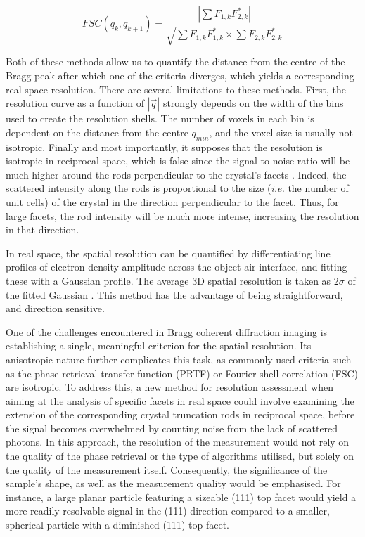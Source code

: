 \begin{equation}
    FSC(q_k, q_{k+1}) = \frac{ |\sum F_{1,k} F_{2,k}^*| }{\sqrt{ \sum F_{1,k} F_{1,k}^* \times \sum F_{2,k} F_{2,k}^*}}
\end{equation}

Both of these methods allow us to quantify the distance from the centre of the Bragg peak after which one of the criteria diverges, which yields a corresponding real space resolution.
There are several limitations to these methods.
First, the resolution curve as a function of $|\vec{q}|$ strongly depends on the width of the bins used to create the resolution shells.
The number of voxels in each bin is dependent on the distance from the centre $q_{min}$, and the voxel size is usually not isotropic.
Finally and most importantly, it supposes that the resolution is isotropic in reciprocal space, which is false since the signal to noise ratio will be much higher around the rods perpendicular to the crystal's facets \parencite{Cherukara2018a}.
Indeed, the scattered intensity along the rods is proportional to the size (\textit{i.e.} the number of unit cells) of the crystal in the direction perpendicular to the facet.
Thus, for large facets, the rod intensity will be much more intense, increasing the resolution in that direction.

In real space, the spatial resolution can be quantified by differentiating line profiles of electron density amplitude across the object-air interface, and fitting these with a Gaussian profile.
The average 3D spatial resolution is taken as 2$\sigma$ of the fitted Gaussian \parencite{Hofmann2020}.
This method has the advantage of being straightforward, and direction sensitive.

One of the challenges encountered in Bragg coherent diffraction imaging is establishing a single, meaningful criterion for the spatial resolution.
Its anisotropic nature further complicates this task, as commonly used criteria such as the phase retrieval transfer function (PRTF) or Fourier shell correlation (FSC) are isotropic.
To address this, a new method for resolution assessment when aiming at the analysis of specific facets in real space could involve examining the extension of the corresponding crystal truncation rods in reciprocal space, before the signal becomes overwhelmed by counting noise from the lack of scattered photons.
In this approach, the resolution of the measurement would not rely on the quality of the phase retrieval or the type of algorithms utilised, but solely on the quality of the measurement itself.
Consequently, the significance of the sample's shape, as well as the measurement quality would be emphasised.
For instance, a large planar particle featuring a sizeable (111) top facet would yield a more readily resolvable signal in the (111) direction compared to a smaller, spherical particle with a diminished (111) top facet.

